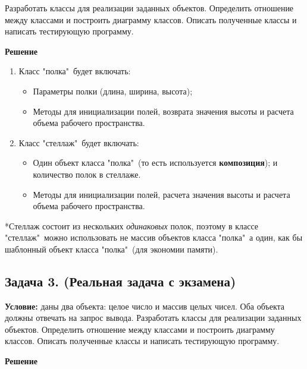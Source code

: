 Разработать классы для реализации заданных объектов. Определить отношение между классами и 
построить диаграмму классов. Описать полученные классы и написать тестирующую программу. 

\noindent
{\bf Решение}

\begin{enumerate}
\item Класс "полка"\ будет включать:
\begin{itemize}
    \item Параметры полки (длина, ширина, высота);
    \item Методы для инициализации полей, возврата значения высоты и расчета объема рабочего пространства. 
\end{itemize}

\item Класс "стеллаж"\ будет включать:
\begin{itemize} 
    \item Один объект класса "полка"\ (то есть используется {\bf композиция});
    и количество полок в стеллаже. 
    \item Методы для инициализации полей, расчета значения высоты и расчета объема рабочего пространства. 
\end{itemize}
\end{enumerate}

*Стеллаж состоит из нескольких \textit {одинаковых} полок, поэтому в классе "стеллаж"\ можно использовать не массив объектов класса "полка"\, а один, как бы шаблонный объект класса "полка"\ (для экономии памяти). 

{}



{}



\newpage\subsection{Задача 3. (Реальная задача с экзамена)}
{\bf Условие:} даны два объекта: целое число и массив целых чисел. Оба объекта должны отвечать на запрос вывода. Разработать классы для реализации заданных объектов. Определить отношение между классами и построить диаграмму классов. Описать полученные классы и написать тестирующую программу. 

\noindent
{\bf Решение}

